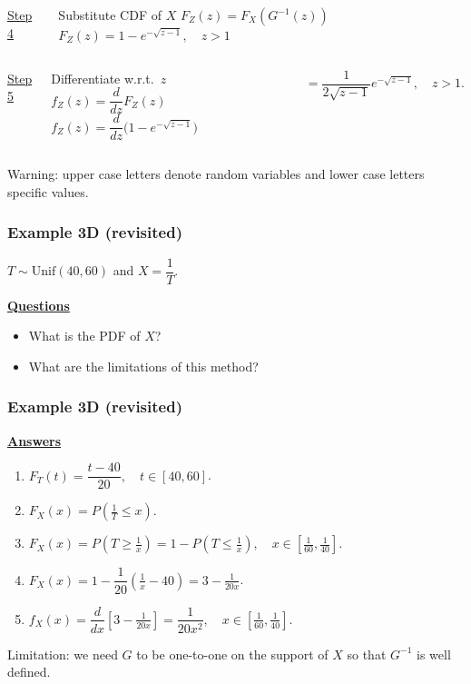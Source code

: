 \documentclass[t,8pt]{beamer}
\begin{document}
\begin{frame}[t]
{\begin{minipage}{\textwidth}
			\begin{columns}[T]
				\underline{Step 4} \par
				Substitute CDF of $X$
				\hfill\break\hfill\break
				$F_Z(z)=F_X(G^{-1}(z))$
				\column{0.4\textwidth}
				\hfill\break\hfill\break
				$F_Z(z)= 1-e^{-\sqrt{z-1}},\quad z>1$
			\end{columns}
		\end{minipage}\par
		\begin{minipage}{\textwidth}
			\begin{columns}[T]
				\column{0.17\textwidth}
				\underline{Step 5} \par
				Differentiate w.r.t.\ $z$
				\column{0.35\textwidth}
				\hfill\break\hfill\break
				$f_Z(z)=\dfrac{d}{dz}F_Z(z)$
				\hfill\break\hfill\break
				$f_Z(z)=\dfrac{d}{dz}\big(1-e^{-\sqrt{z-1}}\big)$ \par
				$\qquad\ \ =\dfrac{1}{2\sqrt{z-1}}e^{-\sqrt{z-1}},\quad z>1.$ \par
				\color{NavyBlue}{\tiny - please do check this!}
			\end{columns}
		\end{minipage}\par
	}
	Warning: upper case letters denote random variables and lower case letters specific values.
\end{frame}

\begin{frame}
	\frametitle{Example 3D (revisited)}
	$T\sim \mathrm{Unif}(40,60)$ and $X=\dfrac 1T$. \par
	{\bf\underline{Questions}}
	\begin{itemize}
		\item What is the PDF of $X$?
		\item What are the limitations of this method?
	\end{itemize}
\end{frame}

\begin{frame}
	\frametitle{Example 3D (revisited)}
	{\bf\underline{Answers}} \par
	\begin{enumerate}
		\item $F_T(t)=\dfrac{t-40}{20},\quad t\in[40,60]$.
		\item $F_X(x)=P\!\left(\frac 1T\leq x\right)$.
		\item $F_X(x)=P\!\left(T\geq \frac 1x\right)=1-P\!\left(T\leq\frac 1x\right),\quad x\in\left[\frac 1{60},\frac 1{40}\right].$
		\item $F_X(x) =1-\dfrac 1{20}\left(\frac 1x-40\right)=3-\frac{1}{20x}$.
		\item $f_X(x)=\dfrac{d}{dx}\!\left[3-\frac{1}{20x}\right]=\dfrac{1}{20x^2},\quad x\in\left[\frac 1{60},\frac 1{40}\right].$
	\end{enumerate}
	Limitation: we need $G$ to be one-to-one on the support of $X$ so that $G^{-1}$ is well defined.
\end{frame}
\end{document}
